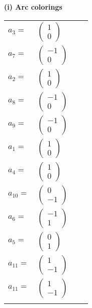 \documentclass[1p]{elsarticle_modified}
\theoremstyle{definition}
\begin{document}
\flushleft \textbf{(i) Arc colorings}\\
\begin{tabular}{m{7pt} m{180pt} m{7pt} m{180pt} }
\flushright $a_{3}=$&$\begin{pmatrix}1\\0\end{pmatrix}$ \\
\flushright $a_{7}=$&$\begin{pmatrix}-1\\0\end{pmatrix}$ \\
\flushright $a_{2}=$&$\begin{pmatrix}1\\0\end{pmatrix}$ \\
\flushright $a_{8}=$&$\begin{pmatrix}-1\\0\end{pmatrix}$ \\
\flushright $a_{9}=$&$\begin{pmatrix}-1\\0\end{pmatrix}$ \\
\flushright $a_{1}=$&$\begin{pmatrix}1\\0\end{pmatrix}$ \\
\flushright $a_{4}=$&$\begin{pmatrix}1\\0\end{pmatrix}$ \\
\flushright $a_{10}=$&$\begin{pmatrix}0\\-1\end{pmatrix}$ \\
\flushright $a_{6}=$&$\begin{pmatrix}-1\\1\end{pmatrix}$ \\
\flushright $a_{5}=$&$\begin{pmatrix}0\\1\end{pmatrix}$ \\
\flushright $a_{11}=$&$\begin{pmatrix}1\\-1\end{pmatrix}$\\ \flushright $a_{11}=$&$\begin{pmatrix}1\\-1\end{pmatrix}$\\&\end{tabular}
\end{document}
